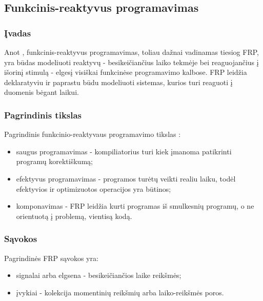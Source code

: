 \subsection{Funkcinis-reaktyvus programavimas}

\subsubsection{Įvadas}

Anot \cite{Survey}, funkcinis-reaktyvus programavimas, toliau dažnai vadinamas tiesiog FRP, yra būdas modeliuoti reaktyvų - besikeičiančius laiko tekmėje bei reaguojančius į išorinį stimulą - elgesį visiškai funkcinėse programavimo kalbose. FRP leidžia deklaratyviu ir paprastu būdu modeliuoti sistemas, kurios turi reaguoti į duomenis bėgant laikui.

\subsubsection{Pagrindinis tikslas}

Pagrindinis funkcinio-reaktyvaus programavimo tikslas \cite{Survey}:

\begin{itemize}

	\item saugus programavimas - kompiliatorius turi kiek įmanoma patikrinti programų korektiškumą;

	\item efektyvus programavimas - programos turėtų veikti realiu laiku, todėl efektyvios ir optimizuotos operacijos yra būtinos;

	\item komponavimas - FRP leidžia kurti programas iš smulkesnių programų, o ne orientuotą į problemą, vientisą kodą.

\end{itemize}

\subsubsection{Sąvokos}

Pagrindinės FRP sąvokos yra:

\begin{itemize}

	\item signalai arba elgsena - besikeičiančios laike reikšmės;

	\item įvykiai - kolekcija momentinių reikšmių arba laiko-reikšmės poros.

\end{itemize}

